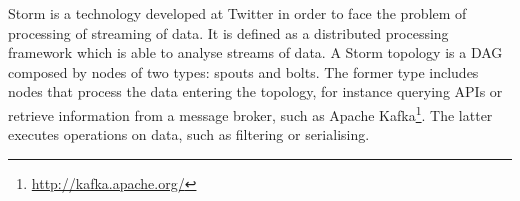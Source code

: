 \documentclass[smallextended]{svjour3}       %
\newcommand{\todoMB}[2]{\linespread{0.7}\todo[color=yellow!50,#1]{\scriptsize\textbf{MB:}#2}}
\begin{document}
Storm is a technology developed at Twitter \cite{toshniwal2014storm} in order to
face the problem of processing of streaming of data. It is defined as a
distributed processing framework which is able to analyse streams of data. A Storm topology is a DAG composed by nodes of two types: spouts and bolts. The former type includes nodes that process the data entering the topology, for instance
querying APIs or retrieve information from a message broker, such as Apache
Kafka\footnote{\url{http://kafka.apache.org/}}. The latter executes operations on data, such as filtering or serialising.



\end{document}
